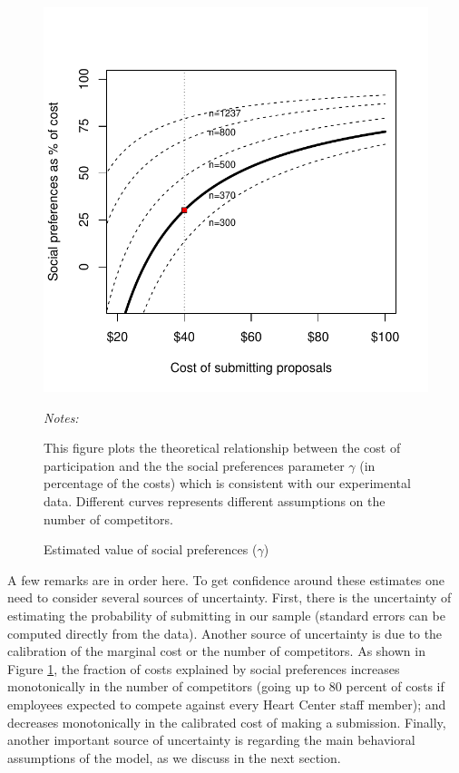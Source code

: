 \documentclass[11pt, titlepage]{article}
\newenvironment{tablenotes}[1][]{
  \begin{minipage}{\textwidth}\emph{Notes:}{\footnotesize #1}
}{\end{minipage}}
\begin{document}
\begin{figure} 
\centering
\caption{Estimated value of social preferences ($\hat\gamma$)}
\label{fig: gamma}
\includegraphics{figures/gamma-1.pdf}
\begin{tablenotes}
This figure plots the theoretical relationship between the cost of participation and the the social preferences parameter $\gamma$ (in percentage of the costs) which is consistent with our experimental data. Different curves represents different assumptions on the number of competitors. 
\end{tablenotes}
\end{figure}

A few remarks are in order here. To get confidence around these
estimates one need to consider several sources of uncertainty. First,
there is the uncertainty of estimating the probability of submitting in
our sample (standard errors can be computed directly from the data).
Another source of uncertainty is due to the calibration of the marginal
cost or the number of competitors. As shown in Figure \ref{fig: gamma},
the fraction of costs explained by social preferences increases
monotonically in the number of competitors (going up to 80 percent of
costs if employees expected to compete against every Heart Center staff
member); and decreases monotonically in the calibrated cost of making a
submission. Finally, another important source of uncertainty is
regarding the main behavioral assumptions of the model, as we discuss in
the next section.
\end{document}
